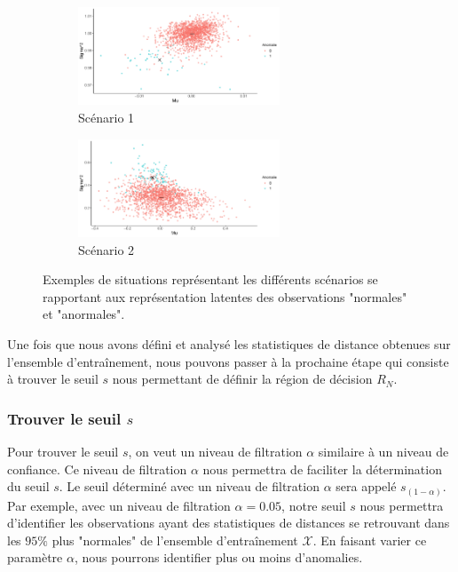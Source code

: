 \begin{figure} [h]
	\centering
	\begin{subfigure}{6cm}
		\includegraphics[width=6cm]{images/plot_near.pdf}
		\caption{Scénario 1}
	\end{subfigure}
	\begin{subfigure}{6cm}
		\includegraphics[width=6cm]{images/plot_away.pdf}
		\caption{Scénario 2}
	\end{subfigure}
	\caption{Exemples de situations représentant les \DIFdelbeginFL {}\DIFdelendFL \DIFaddbeginFL {}\DIFaddendFL différents scénarios se rapportant  aux représentation latentes des observations "normales" et "anormales".}
	\label{fig:scenarios}
\end{figure}

Une fois que nous avons défini et analysé les statistiques de distance obtenues sur l'ensemble d'entraînement, nous pouvons passer à la prochaine étape qui consiste à trouver le seuil $s$ nous permettant de définir la région de décision $R_N$.

\subsubsection{Trouver le seuil $s$}

 Pour trouver le seuil $s$, on veut \DIFdelbegin {}\DIFdelend \DIFaddbegin {}\DIFaddend un niveau de filtration $\alpha$ similaire à un niveau de confiance. Ce niveau de filtration $\alpha$ nous permettra de faciliter la détermination du seuil $s$. Le seuil déterminé avec un niveau de filtration $\alpha$ sera appelé $s_{(1-\alpha)}$. Par exemple, avec un niveau de filtration $\alpha=0.05$, notre seuil $s$ nous permettra d'identifier les observations ayant des statistiques de distances se retrouvant dans les $95\%$ plus "normales" de l'ensemble d'entraînement $\mathcal{X}$. En faisant varier ce paramètre $\alpha$, nous pourrons identifier plus ou moins d'anomalies. \DIFaddbegin {}\DIFaddend 

